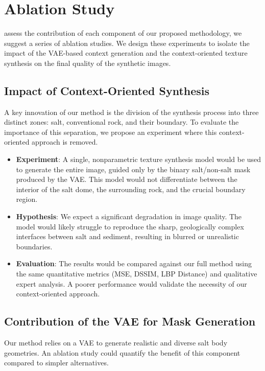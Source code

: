 \documentclass{ieeeaccess}
\begin{document}
\section{Ablation Study}
\label{sec:ablation}

 assess the contribution of each component of our proposed methodology, we suggest a series of ablation studies. We design these experiments to isolate the impact of the VAE-based context generation and the context-oriented texture synthesis on the final quality of the synthetic images.

\subsection{Impact of Context-Oriented Synthesis}

A key innovation of our method is the division of the synthesis process into three distinct zones: salt, conventional rock, and their boundary. To evaluate the importance of this separation, we propose an experiment where this context-oriented approach is removed.

\begin{itemize}
    \item \textbf{Experiment}: A single, nonparametric texture synthesis model would be used to generate the entire image, guided only by the binary salt/non-salt mask produced by the VAE. This model would not differentiate between the interior of the salt dome, the surrounding rock, and the crucial boundary region.
    \item \textbf{Hypothesis}: We expect a significant degradation in image quality. The model would likely struggle to reproduce the sharp, geologically complex interfaces between salt and sediment, resulting in blurred or unrealistic boundaries.
    \item \textbf{Evaluation}: The results would be compared against our full method using the same quantitative metrics (MSE, DSSIM, LBP Distance) and qualitative expert analysis. A poorer performance would validate the necessity of our context-oriented approach.
\end{itemize}

\subsection{Contribution of the VAE for Mask Generation}

Our method relies on a VAE to generate realistic and diverse salt body geometries. An ablation study could quantify the benefit of this component compared to simpler alternatives.
\end{document}
